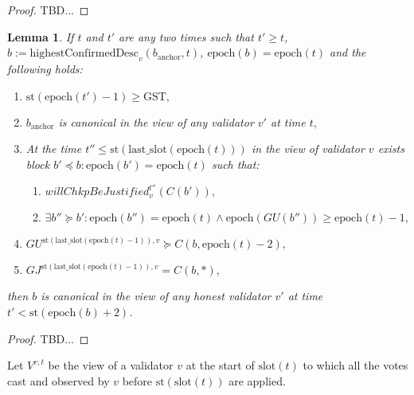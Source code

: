 \documentclass{article}
\newtheorem{lemma}{Lemma}
\begin{document}
\begin{proof}
    TBD...
\end{proof}



\begin{lemma}
   If $t$ and $t'$ are any two times such that $t' \geq t$, $b := \text{highestConfirmedDesc}_v(b_{\text{anchor}}, t)$, $\text{epoch}(b) = \text{epoch}(t)$ and the following holds:
    
    \begin{enumerate}
        \item $\text{st}(\text{epoch}(t') - 1) \geq \text{GST},$
        \item $b_{\text{anchor}}$ is canonical in the view of any validator $v'$ at time $t,$
        \item At the time $t'' \leq \text{st}(\text{last\_slot}(\text{epoch}(t)))$ in the view of validator $v$ exists block $b' \preceq b : \text{epoch}(b') = \text{epoch}(t)$ such that:
        \begin{enumerate}
            \item $willChkpBeJustified^{t''}_v(C(b')),$
            \item $\exists b'' \succeq b' : \text{epoch}(b'') = \text{epoch}(t) \wedge \text{epoch}(GU(b'')) \geq \text{epoch}(t) - 1,$
        \end{enumerate}
        \item $GU^{\text{st}(\text{last\_slot}(\text{epoch}(t) - 1)),v} \succeq C(b, \text{epoch}(t) - 2),$
        \item $GJ^{\text{st}(\text{last\_slot}(\text{epoch}(t) - 1)),v} = C(b, *),$
    \end{enumerate}
    
    then $b$ is canonical in the view of any honest validator $v'$ at time $t' < \text{st}(\text{epoch}(b) + 2)$.
\end{lemma}

\begin{proof}
    TBD...
\end{proof}


Let $V^{v,t}$ be the view of a validator $v$ at the start of $\text{slot}(t)$ to which all the votes cast and observed by $v$ before $\text{st}(\text{slot}(t))$ are applied.
\end{document}
